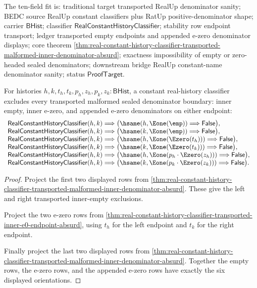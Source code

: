 The ten-field fit is: traditional target transported RealUp denominator
sanity; BEDC source RealUp constant classifiers plus RatUp
positive-denominator shape; carrier $\mathsf{BHist}$; classifier
$\mathsf{RealConstantHistoryClassifier}$; stability row endpoint transport;
ledger transported empty endpoints and appended e-zero denominator displays;
core theorem
\autoref{thm:real-constant-history-classifier-transported-malformed-inner-denominator-absurd};
exactness impossibility of empty or zero-headed sealed denominators;
downstream bridge RealUp constant-name denominator sanity; status
$\mathsf{ProofTarget}$.

\begin{theorem}
\label{thm:real-constant-history-classifier-transported-complete-malformed-inner-denominator-absurd}
For histories $h,k,t_h,t_k,p_h,z_h,p_k,z_k:\mathsf{BHist}$, a constant
real-history classifier excludes every transported malformed sealed
denominator boundary: inner empty, inner e-zero, and appended e-zero
denominators on either endpoint:
$$
\begin{array}{l}
\mathsf{RealConstantHistoryClassifier}(h,k)
\Longrightarrow
\bigl(\hsame(h,\Eone(\emp))\Longrightarrow\mathsf{False}\bigr),\\
\mathsf{RealConstantHistoryClassifier}(h,k)
\Longrightarrow
\bigl(\hsame(k,\Eone(\emp))\Longrightarrow\mathsf{False}\bigr),\\
\mathsf{RealConstantHistoryClassifier}(h,k)
\Longrightarrow
\bigl(\hsame(h,\Eone(\Ezero(t_h)))\Longrightarrow\mathsf{False}\bigr),\\
\mathsf{RealConstantHistoryClassifier}(h,k)
\Longrightarrow
\bigl(\hsame(k,\Eone(\Ezero(t_k)))\Longrightarrow\mathsf{False}\bigr),\\
\mathsf{RealConstantHistoryClassifier}(h,k)
\Longrightarrow
\bigl(\hsame(h,\Eone(p_h\cdot\Ezero(z_h)))\Longrightarrow\mathsf{False}\bigr),\\
\mathsf{RealConstantHistoryClassifier}(h,k)
\Longrightarrow
\bigl(\hsame(k,\Eone(p_k\cdot\Ezero(z_k)))\Longrightarrow\mathsf{False}\bigr).
\end{array}
$$
\end{theorem}
\begin{proof}
Project the first two displayed rows from
\autoref{thm:real-constant-history-classifier-transported-malformed-inner-denominator-absurd}.
These give the left and right transported inner-empty exclusions.

Project the two e-zero rows from
\autoref{thm:real-constant-history-classifier-transported-inner-e0-endpoint-absurd},
using $t_h$ for the left endpoint and $t_k$ for the right endpoint.

Finally project the last two displayed rows from
\autoref{thm:real-constant-history-classifier-transported-malformed-inner-denominator-absurd}.
Together the empty rows, the e-zero rows, and the appended e-zero rows have
exactly the six displayed orientations.
\end{proof}

